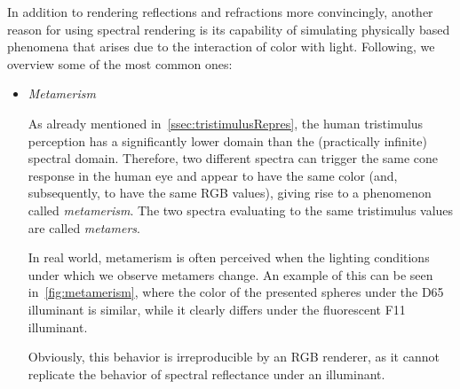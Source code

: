 In addition to rendering reflections and refractions more convincingly, another reason for using spectral rendering is its capability of simulating physically based phenomena that arises due to the interaction of color with light. Following, we overview some of the most common ones:
\begin{itemize}
\item \emph{Metamerism} \label{item:metamerism}

As already mentioned in~\cref{ssec:tristimulusRepres}, the human tristimulus perception has a significantly lower domain than the (practically infinite) spectral domain. Therefore, two different spectra can trigger the same cone response in the human eye and appear to have the same color (and, subsequently, to have the same RGB values), giving rise to a phenomenon called \emph{metamerism}. The two spectra evaluating to the same tristimulus values are called \emph{metamers}.

In real world, metamerism is often perceived when the lighting conditions under which we observe metamers change. An example of this can be seen in~\cref{fig:metamerism}, where the color of the presented spheres under the D65 illuminant is similar, while it clearly differs under the fluorescent F11 illuminant.

Obviously, this behavior is irreproducible by an RGB renderer, as it cannot replicate the behavior of spectral reflectance under an illuminant.


\end{itemize}
